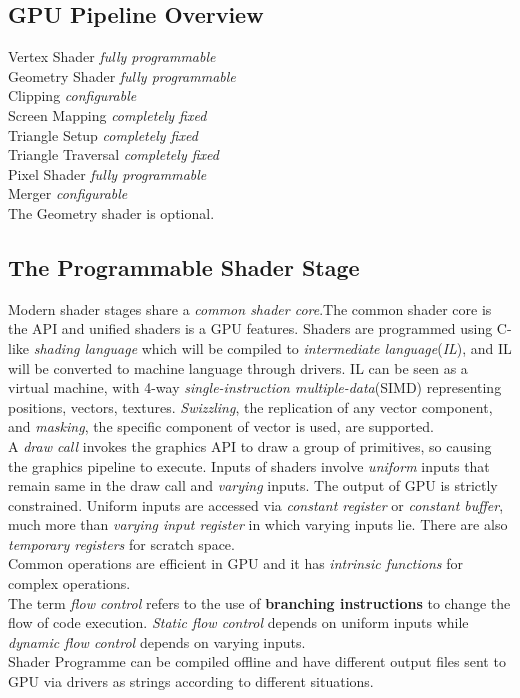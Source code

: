 \documentclass[10pt, a4paper]{article}
\begin{document}
        \subsection{GPU Pipeline Overview}
            \noindent Vertex Shader \hfill\emph{fully programmable}\\
            Geometry Shader \hfill\emph{fully programmable}\\
            Clipping \hfill\emph{configurable}\\
            Screen Mapping \hfill\emph{completely fixed}\\
            Triangle Setup \hfill\emph{completely fixed}\\
            Triangle Traversal \hfill\emph{completely fixed}\\
            Pixel Shader \hfill\emph{fully programmable}\\
            Merger \hfill\emph{configurable}\\
            
            The Geometry shader is optional.

        \subsection{The Programmable Shader Stage}
            Modern shader stages share a \emph{common shader core}.The common shader core is the API and unified shaders is a GPU features. Shaders are programmed using C-like \emph{shading language} which will be compiled to \emph{intermediate language}(\emph{IL}), and IL will be converted to machine language through drivers. IL can be seen as a virtual machine, with 4-way \emph{single-instruction multiple-data}(SIMD) representing positions, vectors, textures. \emph{Swizzling}, the replication of any vector component, and \emph{masking}, the specific component of vector is used, are supported. \\
            \indent A \emph{draw call} invokes the graphics API to draw a group of primitives, so causing the graphics pipeline to execute. Inputs of shaders involve \emph{uniform} inputs that remain same in the draw call and \emph{varying} inputs. The output of GPU is strictly constrained. Uniform inputs are accessed via \emph{constant register} or \emph{constant buffer}, much more than \emph{varying input register} in which varying inputs lie. There are also \emph{temporary registers} for scratch space.\\
            \indent Common operations are efficient in GPU and it has \emph{intrinsic functions} for complex operations.\\
            \indent The term \emph{flow control} refers to the use of \textbf{branching instructions} to change the flow of code execution. \emph{Static flow control} depends on uniform inputs while \emph{dynamic flow control} depends on varying inputs.\\
            Shader Programme can be compiled offline and have different output files sent to GPU via drivers as strings according to different situations.
        
\end{document}
